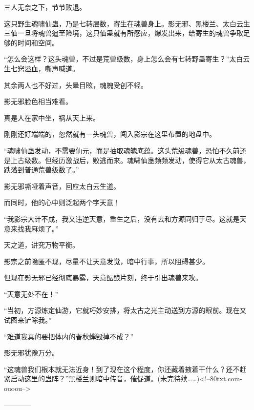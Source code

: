 \begin{this_body}
三人无奈之下，节节败退。

这只野生魂啸仙蛊，乃是七转层数，寄生在魂兽身上。影无邪、黑楼兰、太白云生三仙一旦将魂兽逼至险境，这只仙蛊就有所感应，爆发出来，给寄生的魂兽争取足够的时间和空间。

“怎么会这样？这头魂兽，不过是荒兽级数，身上怎么会有七转野蛊寄生？”太白云生七窍溢血，嘶声喊道。

其余两人也不好过，头晕目眩，魂魄受创不轻。

影无邪脸色相当难看。

真是人在家中坐，祸从天上来。

刚刚还好端端的，忽然就有一头魂兽，闯入影宗在这里布置的地盘中。

“魂啸仙蛊发动，不需要仙元，而是抽取魂魄底蕴。这头荒级魂兽，恐怕不久前还是上古级数。但经历激战后，败逃而来。魂啸仙蛊频频发动，使得它从太古魂兽，跌落到普通荒兽级数了。”

影无邪嘶哑着声音，回应太白云生道。

而同时，他的心中则泛起两个字天意！

“我影宗大计不成，我又违逆天意，重生之后，没有去和方源同归于尽。这就是天意来找我麻烦了。”

天之道，讲究万物平衡。

影宗之前隐匿不现，尽量不让天意发觉，暗中行事，所以阻碍甚少。

但现在影无邪已经彻底暴露，天意酝酿片刻，终于引出魂兽来攻。

“天意无处不在！”

“当初，方源炼定仙游，它就巧妙安排，将太古之光主动送到方源的眼前。现在又试图来铲除我。”

“难道我真的要把体内的春秋蝉毁掉不成？”

影无邪犹豫万分。

“这魂兽我们根本就无法近身！到了现在这个程度，你还藏着掖着干什么？还不赶紧启动这里的蛊阵？”黑楼兰则暗中传音，催促道。(未完待续……)<!--80txt.com-ouoou-->

------------

\end{this_body}

